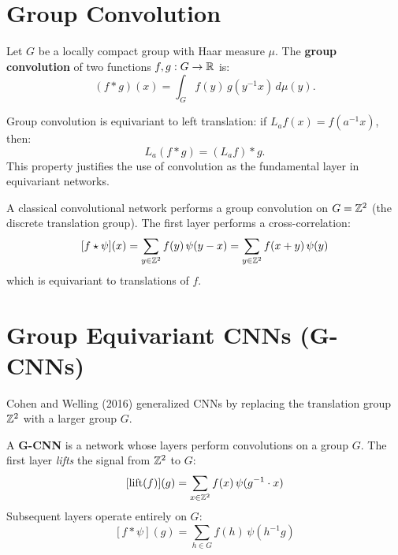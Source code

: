\section{Group Convolution}

\begin{definition}
Let $G$ be a locally compact group with Haar measure $\mu$. The
\textbf{group convolution} of two functions $f, g: G \to \mathbb{R}$ is:
\[
    (f * g)(x) = \int_G f(y)\, g(y^{-1}x)\, d\mu(y).
\]
\end{definition}

\begin{proposition}
Group convolution is equivariant to left translation: if
$L_a f(x) = f(a^{-1}x)$, then:
\[
    L_a(f * g) = (L_a f) * g.
\]
This property justifies the use of convolution as the fundamental layer in
equivariant networks.
\end{proposition}

\begin{theorem}
A classical convolutional network performs a group convolution on
$G = \mathbb{Z}^2$ (the discrete translation group). The first layer performs a
cross-correlation:
\[
    [f \star \psi](x) = \sum_{y \in \mathbb{Z}^2} f(y)\, \psi(y - x)
    = \sum_{y \in \mathbb{Z}^2} f(x + y)\, \psi(y)
\]
which is equivariant to translations of $f$.
\end{theorem}

\section{Group Equivariant CNNs (G-CNNs)}

Cohen and Welling (2016) generalized CNNs by replacing the translation
group $\mathbb{Z}^2$ with a larger group $G$.

\begin{definition}[G-CNN]
A \textbf{G-CNN} is a network whose layers perform convolutions on a
group $G$. The first layer \textit{lifts} the signal from $\mathbb{Z}^2$ to $G$:
\[
    [\text{lift}(f)](g) = \sum_{x \in \mathbb{Z}^2} f(x)\, \psi(g^{-1} \cdot x)
\]
Subsequent layers operate entirely on $G$:
\[
    [f * \psi](g) = \sum_{h \in G} f(h)\, \psi(h^{-1}g)
\]
\end{definition}

